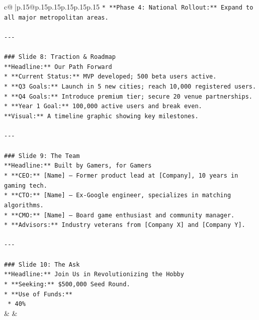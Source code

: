 \documentclass{article}
\begin{document}
{\begin{supertabular}{c@{$\;$}|p{.15\linewidth}@{}p{.15\linewidth}p{.15\linewidth}p{.15\linewidth}p{.15\linewidth}p{.15\linewidth}}
{{{\texttt{*   **Phase 4: National Rollout:** Expand to all major metropolitan areas.} \\
\\ 
\texttt{{-}{-}{-}} \\
\\ 
\texttt{\#\#\# Slide 8: Traction \& Roadmap} \\
\texttt{**Headline:** Our Path Forward} \\
\texttt{*   **Current Status:** MVP developed; 500 beta users active.} \\
\texttt{*   **Q3 Goals:** Launch in 5 new cities; reach 10,000 registered users.} \\
\texttt{*   **Q4 Goals:** Introduce premium tier; secure 20 venue partnerships.} \\
\texttt{*   **Year 1 Goal:** 100,000 active users and break even.} \\
\texttt{**Visual:** A timeline graphic showing key milestones.} \\
\\ 
\texttt{{-}{-}{-}} \\
\\ 
\texttt{\#\#\# Slide 9: The Team} \\
\texttt{**Headline:** Built by Gamers, for Gamers} \\
\texttt{*   **CEO:** {[}Name{]} – Former product lead at {[}Company{]}, 10 years in gaming tech.} \\
\texttt{*   **CTO:** {[}Name{]} – Ex{-}Google engineer, specializes in matching algorithms.} \\
\texttt{*   **CMO:** {[}Name{]} – Board game enthusiast and community manager.} \\
\texttt{*   **Advisors:** Industry veterans from {[}Company X{]} and {[}Company Y{]}.} \\
\\ 
\texttt{{-}{-}{-}} \\
\\ 
\texttt{\#\#\# Slide 10: The Ask} \\
\texttt{**Headline:** Join Us in Revolutionizing the Hobby} \\
\texttt{*   **Seeking:** \$500,000 Seed Round.} \\
\texttt{*   **Use of Funds:**} \\
\texttt{    *   40\%} \\
            }
        }
    }
    & & \\ \\


\end{supertabular}}
\end{document}
